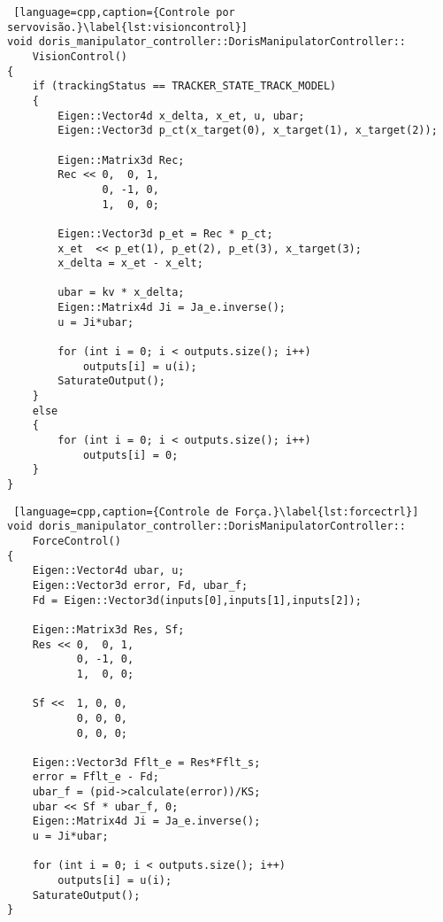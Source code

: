 \newpage 
\begin{lstlisting} [language=cpp,caption={Controle por servovisão.}\label{lst:visioncontrol}]
void doris_manipulator_controller::DorisManipulatorController::
	VisionControl()
{
    if (trackingStatus == TRACKER_STATE_TRACK_MODEL)
    {
        Eigen::Vector4d x_delta, x_et, u, ubar;
        Eigen::Vector3d p_ct(x_target(0), x_target(1), x_target(2));

        Eigen::Matrix3d Rec;
        Rec << 0,  0, 1,
               0, -1, 0,
               1,  0, 0;

        Eigen::Vector3d p_et = Rec * p_ct;
        x_et  << p_et(1), p_et(2), p_et(3), x_target(3);
        x_delta = x_et - x_elt;

        ubar = kv * x_delta;
        Eigen::Matrix4d Ji = Ja_e.inverse();
        u = Ji*ubar;

        for (int i = 0; i < outputs.size(); i++)
            outputs[i] = u(i);
        SaturateOutput();
    }
    else
    {
        for (int i = 0; i < outputs.size(); i++)
            outputs[i] = 0;
    }
}
\end{lstlisting}

\newpage 
\begin{lstlisting} [language=cpp,caption={Controle de Força.}\label{lst:forcectrl}]
void doris_manipulator_controller::DorisManipulatorController::
	ForceControl()
{
    Eigen::Vector4d ubar, u;
    Eigen::Vector3d error, Fd, ubar_f;
    Fd = Eigen::Vector3d(inputs[0],inputs[1],inputs[2]);

    Eigen::Matrix3d Res, Sf;
    Res << 0,  0, 1,
           0, -1, 0,
           1,  0, 0;

    Sf <<  1, 0, 0,
           0, 0, 0,
           0, 0, 0;

    Eigen::Vector3d Fflt_e = Res*Fflt_s;
    error = Fflt_e - Fd;
    ubar_f = (pid->calculate(error))/KS;
    ubar << Sf * ubar_f, 0;
    Eigen::Matrix4d Ji = Ja_e.inverse();
    u = Ji*ubar;

    for (int i = 0; i < outputs.size(); i++)
        outputs[i] = u(i);
    SaturateOutput();
}
\end{lstlisting}